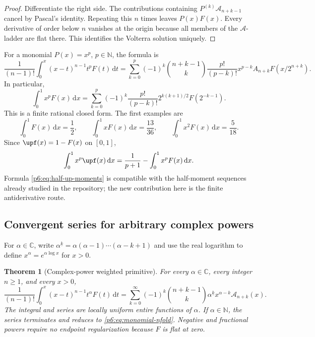 \documentclass[11pt,oneside]{article}
\newtheorem{theorem}{Theorem}[section]
\theoremstyle{definition}
\theoremstyle{remark}
\newcommand{\C}{\mathbb C}
\newcommand{\N}{\mathbb N}
\newcommand{\dd}{\,\mathrm d}
\newcommand{\fall}[2]{#1^{\underline{#2}}}
\newcommand{\1}{\mathbf 1}
\begin{document}
\begin{proof}
Differentiate the right side.  The contributions containing \(P^{(k)}\mathcal
A_{n+k-1}\) cancel by Pascal's identity.  Repeating this \(n\) times leaves
\(P(x)F(x)\).  Every derivative of order below \(n\) vanishes at the origin because all
members of the \(\mathcal A\)-ladder are flat there.  This identifies the Volterra
solution uniquely.
\end{proof}

For a monomial \(P(x)=x^p\), \(p\in\N\), the formula is
\begin{equation}
 \frac1{(n-1)!}\int_0^x(x-t)^{n-1}t^pF(t)\dd t
 =\sum_{k=0}^{p}(-1)^k\binom{n+k-1}{k}
   \frac{p!}{(p-k)!}x^{p-k}A_{n+k}F(x/2^{n+k}).            \label{p6:eq:monomial-nfold}
\end{equation}
In particular,
\begin{equation}
 \int_0^1x^pF(x)\dd x
 =\sum_{k=0}^{p}(-1)^k\frac{p!}{(p-k)!}
   2^{k(k+1)/2}F(2^{-k-1}).                               \label{p6:eq:integer-moment-F}
\end{equation}
This is a finite rational closed form.  The first examples are
\begin{equation}
 \int_0^1F(x)\dd x=\frac12,\qquad
 \int_0^1xF(x)\dd x=\frac{13}{36},\qquad
 \int_0^1x^2F(x)\dd x=\frac5{18}.                        \label{p6:eq:first-F-moments}
\end{equation}
Since \(\upf(x)=1-F(x)\) on \([0,1]\),
\begin{equation}
 \int_0^1x^p\upf(x)\dd x
 =\frac1{p+1}-\int_0^1x^pF(x)\dd x.                      \label{p6:eq:half-up-moments}
\end{equation}
Formula \eqref{p6:eq:half-up-moments} is compatible with the half-moment sequences already
studied in the repository; the new contribution here is the finite antiderivative route.

\subsection{Convergent series for arbitrary complex powers}

For \(\alpha\in\C\), write
\(
 \fall{\alpha}{k}=\alpha(\alpha-1)\cdots(\alpha-k+1)
\)
and use the real logarithm to define \(x^\alpha=e^{\alpha\log x}\) for \(x>0\).

\begin{theorem}[Complex-power weighted primitive]
\label{p6:thm:complex-power}
For every \(\alpha\in\C\), every integer \(n\ge1\), and every \(x>0\),
\begin{equation}
 \boxed{
 \frac1{(n-1)!}\int_0^x(x-t)^{n-1}t^\alpha F(t)\dd t
 =\sum_{k=0}^{\infty}(-1)^k\binom{n+k-1}{k}
   \fall{\alpha}{k}x^{\alpha-k}\mathcal A_{n+k}(x).
 }                                                        \label{p6:eq:complex-power-series}
\end{equation}
The integral and series are locally uniform entire functions of \(\alpha\).  If
\(\alpha\in\N\), the series terminates and reduces to
\eqref{p6:eq:monomial-nfold}.  Negative and fractional powers require no endpoint
regularization because \(F\) is flat at zero.
\end{theorem}
\end{document}

